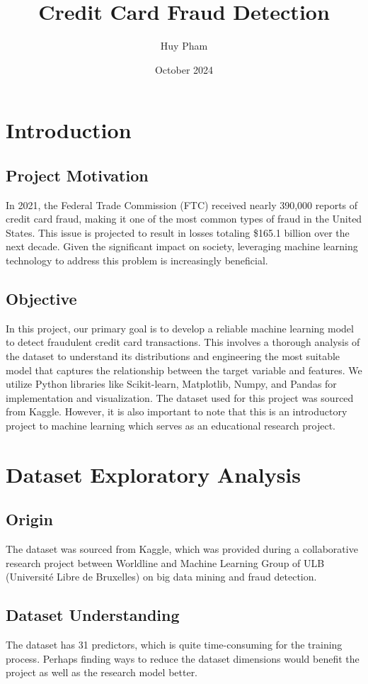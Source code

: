\documentclass[12pt, letterpaper]{article}
\title{Credit Card Fraud Detection}
\author{Huy Pham}
\date{October 2024}
\begin{document}
\maketitle

\section{Introduction}
    \subsection{Project Motivation}
        In 2021, the Federal Trade Commission (FTC) received nearly 390,000 reports of credit card fraud, making it one of the most common types of fraud in the United States. This issue is projected to result in losses totaling \$165.1 billion over the next decade. Given the significant impact on society, leveraging machine learning technology to address this problem is increasingly beneficial.

    \subsection{Objective}
        In this project, our primary goal is to develop a reliable machine learning model to detect fraudulent credit card transactions. This involves a thorough analysis of the dataset to understand its distributions and engineering the most suitable model that captures the relationship between the target variable and features. We utilize Python libraries like Scikit-learn, Matplotlib, Numpy, and Pandas for implementation and visualization. The dataset used for this project was sourced from Kaggle. However, it is also important to note that this is an introductory project to machine learning which serves as an educational research project.
        
\section{Dataset Exploratory Analysis}
    \subsection{Origin}
        The dataset was sourced from Kaggle, which was provided during a collaborative research project between Worldline and Machine Learning Group of ULB (Université Libre de Bruxelles) on big data mining and fraud detection. \cite{Kaggle}
        
    \subsection{Dataset Understanding}
        The dataset has 31 predictors, which is quite time-consuming for the training process. Perhaps finding ways to reduce the dataset dimensions would benefit the project as well as the research model better.
\end{document}
